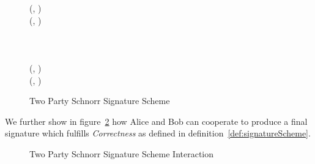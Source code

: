\begin{figure}
\begin{center}
{\begin{varwidth}{\textwidth}
{            }
            \procedure[linenumbering]{$\procFinSig{\varSigAlice}{\varSigBob}$} {
            (\varSAlice, \varRandAlice) \opFunResult \varSigAlice \\
            (\varSBob, \varRandBob) \opFunResult \varSigBob \\
            \varRand \opAssign \varRandAlice \opAddPoint \varRandBob \\
            \varPubKeyComp \opAssign \varPubKeyAlice \opAddPoint \varPubKeyBob \\
            \varS \opAssign \varSAlice \opAddScalar \varSBob \\
            \varSigFin \opAssign (\varS, \varRand) \\
            \pcreturn (\varSigFin, \varPubKeyComp)
            }
        \end{varwidth}
        }
    \end{center}
    \caption{Two Party Schnorr Signature Scheme}
    \label{fig:twoparty-schnorr}
\end{figure}

We further show in figure~\ref{fig:twoparty-schnorr-prot} how Alice and Bob can cooperate to produce a final signature which fulfills \textit{Correctness} as defined in definition~\ref{def:signatureScheme}.

\begin{figure}
    \centering
    \caption{Two Party Schnorr Signature Scheme Interaction}
    \label{fig:twoparty-schnorr-prot}
\end{figure}

